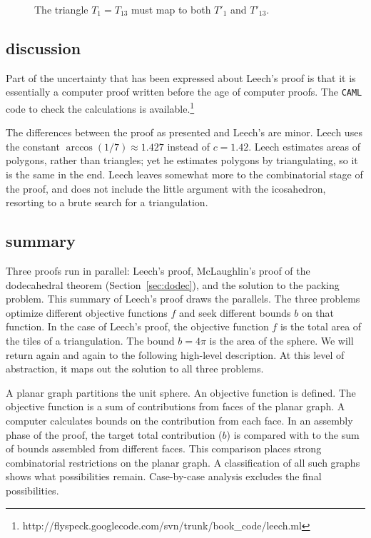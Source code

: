 \begin{figure}[htb]
  \centering
  \caption{The triangle $T_1=T_{13}$ must map to both $T'_1$ and $T'_{13}$.}
  \label{fig:th:D}
\end{figure}


\subsection{discussion}


Part of the uncertainty that has been expressed about
Leech's proof is that it is essentially a computer proof written before
the age of computer proofs.  The {\tt CAML} code  to check the
calculations is available.\footnote{http://flyspeck.googlecode.com/svn/trunk/book\_code/leech.ml}

The differences between the proof as presented and Leech's are minor.  Leech
uses the constant $\arccos(1/7)\approx 1.427$ instead of $c=1.42$.  Leech estimates
areas of polygons, rather than triangles; yet he estimates polygons by triangulating,
so it is the same in the end.  Leech leaves somewhat more to the combinatorial stage of the proof, and  does not include the little argument with
the icosahedron,  resorting to a brute search for a triangulation.

\subsection{summary}\label{sec:summary}

Three proofs run in parallel: Leech's proof, McLaughlin's proof of the dodecahedral theorem (Section~\ref{sec:dodec}), and
the solution to the packing problem.
This summary of Leech's proof draws the parallels.
The three problems optimize different objective functions $f$ and seek different
bounds $b$ on that function. In the case of Leech's proof, the objective
function $f$ is the total 
area of the tiles of a triangulation.  The bound $b=4\pi$ is the area of
the sphere.  We will return again and again to the following high-level description.  At this level of abstraction, it maps out the solution
to all three problems.

{\it

A planar graph partitions the
unit sphere.  An objective function is defined.
The objective function is a sum
of contributions from  faces of the planar graph.  
A computer calculates bounds
on the contribution from each face.  In an assembly phase of the proof, 
the target total contribution ($b$) is compared
with to the sum of bounds assembled from different faces. 
This comparison places
strong combinatorial restrictions on the planar graph.  
A classification of all 
such graphs shows what possibilities remain.  
Case-by-case analysis excludes the final possibilities.

}

